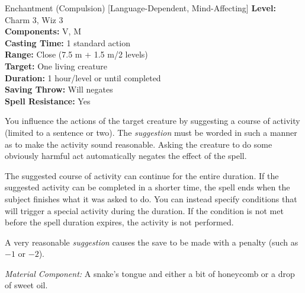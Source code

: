 {Enchantment (Compulsion) [Language-Dependent, Mind-Affecting]}
{
	\textbf{Level:}
	Charm 3, Wiz 3\\
	\textbf{Components:}
	V, M\\
	\textbf{Casting Time:}
	1 standard action\\
	\textbf{Range:}
	Close (7.5 m + 1.5 m/2 levels)\\
	\textbf{Target:}
	One living creature\\
	\textbf{Duration:}
	1 hour/level or until completed\\
	\textbf{Saving Throw:}
	Will negates\\
	\textbf{Spell Resistance:}
	Yes\\
}
{
	You influence the actions of the target creature by suggesting a course of activity (limited to a sentence or two). The \emph{suggestion} must be worded in such a manner as to make the activity sound reasonable. Asking the creature to do some obviously harmful act automatically negates the effect of the spell.

	The suggested course of activity can continue for the entire duration. If the suggested activity can be completed in a shorter time, the spell ends when the subject finishes what it was asked to do. You can instead specify conditions that will trigger a special activity during the duration. If the condition is not met before the spell duration expires, the activity is not performed.

	A very reasonable \emph{suggestion} causes the save to be made with a penalty (such as $-1$ or $-2$).

	\textit{Material Component:}
	A snake's tongue and either a bit of honeycomb or a drop of sweet oil.

}
